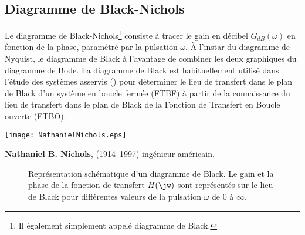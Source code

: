 \subsection{Diagramme de Black-Nichols}
Le diagramme de Black-Nichols\footnote{Il également simplement appelé diagramme 
de Black.} consiste à tracer le gain en décibel $G_{dB}(\omega)$ en fonction de 
la phase, paramétré par la pulsation $\omega$. À l'instar du diagramme de 
Nyquist, le diagramme de Black à l'avantage de combiner les deux graphiques 
du diagramme de Bode. La diagramme de Black est habituellement utilisé dans 
l'étude des systèmes asservis () pour déterminer le lieu 
de transfert dans le plan de Black d'un système en boucle fermée (FTBF) à 
partir de la connaissance du lieu de transfert dans le plan de Black de la 
Fonction de Transfert en Boucle ouverte (FTBO).
\begin{marginfigure}
    \centering
    \texttt{[image: NathanielNichols.eps]} 
    \caption*{\textbf{Nathaniel B. Nichols}, 
              (1914–1997) ingénieur américain.}
\end{marginfigure}
\begin{figure}[!h]
    \centering
    
    \caption{Représentation schématique d'un diagramme de Black. Le gain et 
             la phase de la fonction de transfert $H(\jw)$ sont représentés sur
             le lieu de Black pour différentes valeurs de la pulsation $\omega$
             de 0 à $\infty$.\label{fig-sche_black}}
\end{figure}
\newpage
\restoregeometry
\captionsetup{width=0.9\linewidth}
